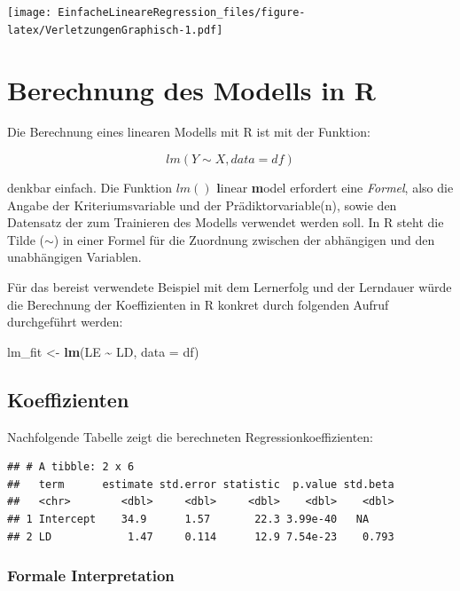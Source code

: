 \documentclass[
]{article}
\newenvironment{Shaded}{\begin{snugshade}}{\end{snugshade}}
\newcommand{\AttributeTok}[1]{\textcolor[rgb]{0.13,0.29,0.53}{#1}}
\newcommand{\FunctionTok}[1]{\textcolor[rgb]{0.13,0.29,0.53}{\textbf{#1}}}
\newcommand{\NormalTok}[1]{#1}
\newcommand{\OtherTok}[1]{\textcolor[rgb]{0.56,0.35,0.01}{#1}}
\newcommand{\SpecialCharTok}[1]{\textcolor[rgb]{0.81,0.36,0.00}{\textbf{#1}}}
\begin{document}
\texttt{[image: EinfacheLineareRegression\_files/figure-latex/VerletzungenGraphisch-1.pdf]}

\section*{\texorpdfstring{Berechnung des Modells in \textbf{R}}{Berechnung des Modells in R}}\label{berechnung-des-modells-in-r}

Die Berechnung eines linearen Modells mit R ist mit der Funktion:

\[lm(Y \sim X, data = df)\]

denkbar einfach. Die Funktion \(lm()\) \textbf{l}inear \textbf{m}odel erfordert eine \emph{Formel}, also die Angabe der Kriteriumsvariable und der Prädiktorvariable(n), sowie den Datensatz der zum Trainieren des Modells verwendet werden soll. In R steht die Tilde (\(\sim\)) in einer Formel für die Zuordnung zwischen der abhängigen und den unabhängigen Variablen.

Für das bereist verwendete Beispiel mit dem Lernerfolg und der Lerndauer würde die Berechnung der Koeffizienten in R konkret durch folgenden Aufruf durchgeführt werden:

\begin{Shaded}
\begin{Highlighting}[]
\NormalTok{  lm\_fit }\OtherTok{\textless{}{-}} \FunctionTok{lm}\NormalTok{(LE }\SpecialCharTok{\textasciitilde{}}\NormalTok{ LD, }\AttributeTok{data =}\NormalTok{ df)}
\end{Highlighting}
\end{Shaded}

\subsection*{Koeffizienten}\label{koeffizienten}

Nachfolgende Tabelle zeigt die berechneten Regressionkoeffizienten:

\begin{verbatim}
## # A tibble: 2 x 6
##   term      estimate std.error statistic  p.value std.beta
##   <chr>        <dbl>     <dbl>     <dbl>    <dbl>    <dbl>
## 1 Intercept    34.9      1.57       22.3 3.99e-40   NA    
## 2 LD            1.47     0.114      12.9 7.54e-23    0.793
\end{verbatim}

\subsubsection*{Formale Interpretation}\label{formale-interpretation}
\end{document}
